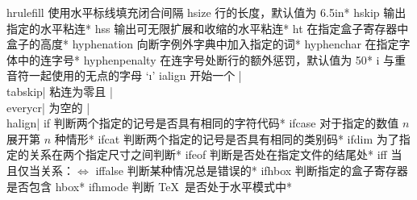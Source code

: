 \capcs hrulefill {使用水平标线填充闭合间隔}{}{}
\capcs hsize {行的长度，默认值为 6.5\thinspace in}*{}
\capcs hskip {输出指定的水平粘连}*{}
\capcs hss {输出可无限扩展和收缩的水平粘连}*{}
\capcs ht {在指定盒子寄存器中盒子的高度}*{}
\capcs hyphenation {向断字例外字典中加入指定的词}*{}
\capcs hyphenchar {在指定字体中的连字号}*{}
\capcs hyphenpenalty {在连字号处断行的额外惩罚，默认值为 50}*{}
\capcs i {与重音符一起使用的无点的字母 `\i'}{}{}
\capcs ialign {开始一个 |\\tabskip| 粘连为零且 |\\everycr| 为空的 |\\halign|}{}{}
\capcs if {判断两个指定的记号是否具有相同的字符代码}*{\@if}
\capcs ifcase {对于指定的数值 $n$ 展开第 $n$ 种情形}*{\@ifcase}
\capcs ifcat {判断两个指定的记号是否具有相同的类别码}*{\@ifcat}
\capcs ifdim {为了指定的关系在两个指定尺寸之间判断}*{\@ifdim}
\capcs ifeof {判断是否处在指定文件的结尾处}*{\@ifeof}
\capcs iff {当且仅当关系：$\iff$}{}{}
\capcs iffalse {判断某种情况总是错误的}*{\@iffalse}
\capcs ifhbox {判断指定的盒子寄存器是否包含 hbox}*{\@ifhbox}
\capcs ifhmode {判断 \TeX\ 是否处于水平模式中}*{\@ifhmode}
